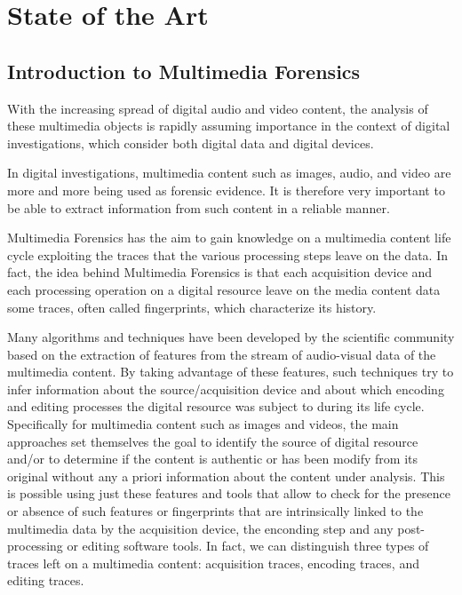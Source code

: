 \chapter{State of the Art}

\section{Introduction to Multimedia Forensics}

With the increasing spread of digital audio and video content, the analysis of these multimedia objects is rapidly assuming importance in the context of digital investigations, which consider both digital data and digital devices.

In digital investigations, multimedia content such as images, audio, and video are more and more being used as forensic evidence. It is therefore very important to be able to extract information from such content in a reliable manner.

Multimedia Forensics has the aim to gain knowledge on a multimedia content life cycle exploiting the traces that the various processing steps leave on the data. In fact, the idea behind Multimedia Forensics is that each acquisition device and each processing operation on a digital resource leave on the media content data some traces, often called fingerprints, which characterize its history.

Many algorithms and techniques have been developed by the scientific community based on the extraction of features from the stream of audio-visual data of the multimedia content. By taking advantage of these features, such techniques try to infer information about the source/acquisition device and about which encoding and editing processes the digital resource was subject to during its life cycle. Specifically for multimedia content such as images and videos, the main approaches set themselves the goal to identify the source of digital resource and/or to determine if the content is authentic or has been modify from its original without any a priori information about the content under analysis. This is possible using just these features and tools that allow to check for the presence or absence of such features or fingerprints that are intrinsically linked to the multimedia data by the acquisition device, the enconding step and any post-processing or editing software tools. In fact, we can distinguish three types of traces left on a multimedia content: acquisition traces, encoding traces, and editing traces.

